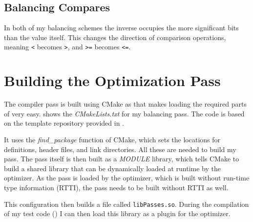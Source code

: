 \subsection{Balancing Compares}
In both of my balancing schemes the inverse occupies the more significant bits than the value itself.
This changes the direction of comparison operations, meaning \texttt{<} becomes \texttt{>}, and \texttt{>=} becomes \texttt{<=}.

\section{Building the Optimization Pass}
\label{buildpass}
The compiler pass is built using CMake as that makes loading the required parts of \llvm{} very easy.
 shows the \emph{CMakeLists.txt} for my balancing pass.
The code is based on the template repository provided in \cite{sampson2015llvm}.



It uses the \emph{find\_package} function of CMake, which sets the locations for definitions, header files, and link directories.
All these are needed to build my pass.
The pass itself is then built as a \emph{MODULE} library, which tells CMake to build a shared library that can be dynamically loaded at runtime by the optimizer.
As the pass is loaded by the optimizer, which is built without run-time type information (RTTI), the pass needs to be built without RTTI as well.

This configuration then builds a file called \texttt{libPasses.so}.
During the compilation of my test code () I can then load this library as a plugin for the \llvm{} optimizer.
